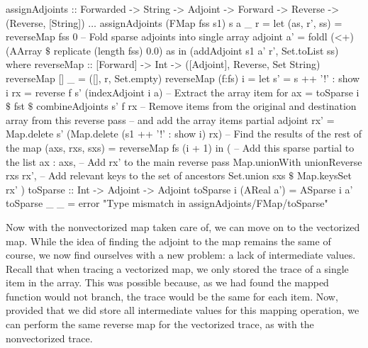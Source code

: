             \begin{haskell}[caption=Implementation of \texttt{assignAdjoints} for the map operation, label=lst:assign_map, gobble=16]
                assignAdjoints :: Forwarded -> String -> Adjoint -> Forward -> Reverse
                    -> (Reverse, [String])
                $\dots$
                assignAdjoints (FMap fss s1) s a _ r =
                    let (as, r', ss) = reverseMap fss 0
                        -- Fold sparse adjoints into single array adjoint
                        a' = foldl (<+) (AArray $\$$ replicate (length fss) 0.0) as
                    in  (addAdjoint s1 a' r', Set.toList ss)
                    where
                        reverseMap :: [Forward] -> Int -> ([Adjoint], Reverse, Set String)
                        reverseMap []     _ = ([], r, Set.empty)
                        reverseMap (f:fs) i =
                            let s'  = s ++ '!' : show i
                                rx  = reverse f s' (indexAdjoint i a)
                                -- Extract the array item for 
                                ax  = toSparse i $\$$ fst $\$$ combineAdjoints s' f rx
                                -- Remove items from the original and destination array from this reverse pass
                                -- and add the array items partial adjoint
                                rx' = Map.delete s' (Map.delete (s1 ++ '!' : show i) rx)
                                -- Find the results of the rest of the map
                                (axs, rxs, sxs) = reverseMap fs (i + 1)
                            in  (
                                -- Add this sparse partial to the list
                                ax : axs,
                                -- Add rx' to the main reverse pass
                                Map.unionWith unionReverse rxs rx',
                                -- Add relevant keys to the set of ancestors
                                Set.union sxs $\$$ Map.keysSet rx'
                            )
                        toSparse :: Int -> Adjoint -> Adjoint
                        toSparse i (AReal a') = ASparse i a'
                        toSparse _ _          =
                            error "Type mismatch in assignAdjoints/FMap/toSparse"
            \end{haskell}

            Now with the nonvectorized map taken care of, we can move on to the vectorized map.
            While the idea of finding the adjoint to the map remains the same of course, we now find ourselves with a new problem: a lack of intermediate values.
            Recall that when tracing a vectorized map, we only stored the trace of a single item in the array.
            This was possible because, as we had found the mapped function would not branch, the trace would be the same for each item.
            Now, provided that we did store all intermediate values for this mapping operation, we can perform the same reverse map for the vectorized trace, as with the nonvectorized trace.

